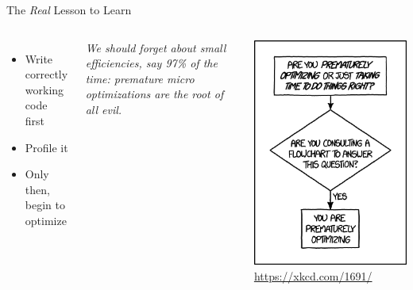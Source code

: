 
\begin{frame}{The \emph{Real} Lesson to Learn}
%
\begin{columns}
\begin{itemize}
\item Write correctly working code first
\item Profile it
\item Only then, begin to optimize
\end{itemize}

\vspace{6pt}
\begin{hintbox}
\emph{We should forget about small efficiencies, say 97\% of the time: premature micro optimizations are the root of all evil.}
\end{hintbox}
%
\begin{center}
\includegraphics[width=.8\linewidth]{./gfx/05-xkcd-premature-optimization}
\scriptsize
\url{https://xkcd.com/1691/}
\end{center}
\end{columns}
%
\end{frame}


